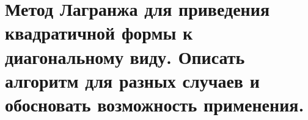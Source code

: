 \section{
    Метод Лагранжа для приведения квадратичной формы к диагональному виду. Описать алгоритм для разных случаев и обосновать возможность применения.
}


